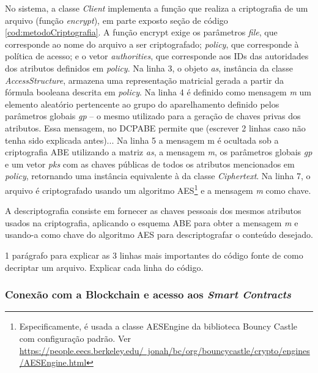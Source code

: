 \documentclass[a4paper,11pt]{article}
\begin{document}
No sistema, a classe \emph{Client} implementa a função que realiza a criptografia de um arquivo (função \emph{encrypt}), em parte exposto seção de código \ref{cod:metodoCriptografia}. A função encrypt exige os parâmetros \emph{file}, que corresponde ao nome do arquivo a ser criptografado; \emph{policy}, que corresponde à política de acesso; e o vetor \emph{authorities}, que corresponde aos IDs das autoridades dos atributos definidos em \emph{policy}. Na linha 3, o objeto \emph{as}, instância da classe \emph{AccessStructure}, armazena uma representação matricial gerada a partir da fórmula booleana descrita em \emph{policy}. %
Na linha 4 é definido como mensagem \emph{m} um elemento aleatório pertencente ao grupo do aparelhamento definido pelos parâmetros globais \emph{gp} -- o mesmo utilizado para a geração de chaves privas dos atributos. {\color{magenta} Essa mensagem, no DCPABE permite que (escrever 2 linhas caso não tenha sido explicada antes)...} Na linha 5 a mensagem m é ocultada sob a criptografia ABE utilizando a matriz \emph{as}, a mensagem \emph{m}, os parâmetros globais \emph{gp} e um vetor \emph{pks} com as chaves públicas de todos os atributos mencionados em \emph{policy}, retornando uma instância equivalente à da classe \emph{Ciphertext}. %
Na linha 7, o arquivo é criptografado usando um algoritmo AES\footnote{Especificamente, é usada a classe AESEngine da biblioteca Bouncy Castle com configuração padrão. Ver \href{https://people.eecs.berkeley.edu/~jonah/bc/org/bouncycastle/crypto/engines/AESEngine.html}{https://people.eecs.berkeley.edu/~jonah/bc/org/bouncycastle/crypto/engines/AESEngine.html}} e a mensagem \emph{m} como chave.

A descriptografia consiste em fornecer as chaves pessoais dos mesmos atributos usados na criptografia, aplicando o esquema ABE para obter a mensagem \emph{m} e usando-a como chave do algoritmo AES para descriptografar o conteúdo desejado.

{\color{Magenta} 1 parágrafo para explicar as 3 linhas mais importantes do código fonte de como decriptar um arquivo. Explicar cada linha do código.}

\subsubsection{Conexão com a Blockchain e acesso aos \textit{Smart Contracts}}
\end{document}

